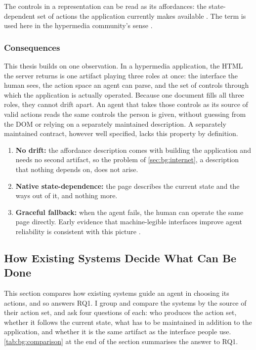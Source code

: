 The controls in a representation can be read as its affordances: the state-dependent set of actions the application currently makes available \cite{gidey2025affordance}.
The term is used here in the hypermedia community's sense \cite{hypermediaBook}.

\subsubsection{Consequences}

This thesis builds on one observation.
In a hypermedia application, the HTML the server returns is one artifact playing three roles at once: the interface the human sees, the action space an agent can parse, and the set of controls through which the application is actually operated.
Because one document fills all three roles, they cannot drift apart.
An agent that takes those controls as its source of valid actions reads the same controls the person is given, without guessing from the DOM or relying on a separately maintained description.
A separately maintained contract, however well specified, lacks this property by definition.

\begin{enumerate}
    \item \textbf{No drift:} the affordance description comes with building the application and needs no second artifact, so the problem of \autoref{sec:bg:internet}, a description that nothing depends on, does not arise.
    \item \textbf{Native state-dependence:} the page describes the current state and the ways out of it, and nothing more.
    \item \textbf{Graceful fallback:} when the agent fails, the human can operate the same page directly.
    Early evidence that machine-legible interfaces improve agent reliability is consistent with this picture \cite{schultze2025building}.
\end{enumerate}

\subsection{How Existing Systems Decide What Can Be Done}\label{sec:bg:frameworks}



This section compares how existing systems guide an agent in choosing its actions, and so answers RQ1.
I group and compare the systems by the source of their action set, and ask four questions of each: who produces the action set, whether it follows the current state, what has to be maintained in addition to the application, and whether it is the same artifact as the interface people use.
\autoref{tab:bg:comparison} at the end of the section summarises the answer to RQ1.

